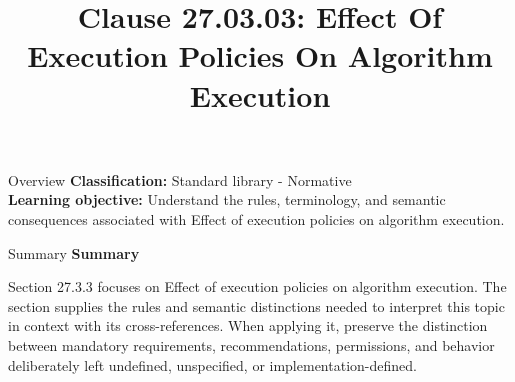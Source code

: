 \documentclass[10pt,letterpaper]{article}
\title{Clause 27.03.03: Effect Of Execution Policies On Algorithm Execution}
\author{}
\date{}
\begin{document}
\maketitle
\begin{CornellOverviewBox}{Overview}
\textbf{Classification:} Standard library - Normative\\[2pt]
\textbf{Learning objective:} Understand the rules, terminology, and semantic consequences associated with Effect of execution policies on algorithm execution.
\end{CornellOverviewBox}\begin{CornellSummaryBox}{Summary}
{\sffamily\bfseries\color{Accent} Summary}\par\vspace{3pt}Section 27.3.3 focuses on Effect of execution policies on algorithm execution. The section supplies the rules and semantic distinctions needed to interpret this topic in context with its cross-references. When applying it, preserve the distinction between mandatory requirements, recommendations, permissions, and behavior deliberately left undefined, unspecified, or implementation-defined.
\end{CornellSummaryBox}
\end{document}
